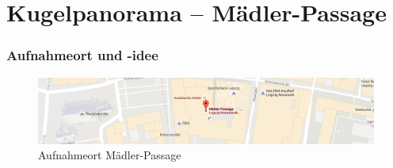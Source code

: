\documentclass[liststotoc,bibtotoc,fontsize=14pt,]{scrreprt}
\begin{document}
	\section{Kugelpanorama --  Mädler-Passage}
	\label{sec:kugel}
			\subsubsection{Aufnahmeort und -idee}
			
			\begin{figure}[H]
				\includegraphics[width=\linewidth]{img/places/mae_map.jpg}
				\caption{Aufnahmeort Mädler-Passage}
				\label{img:mae_map}
			\end{figure}
			
\end{document}
